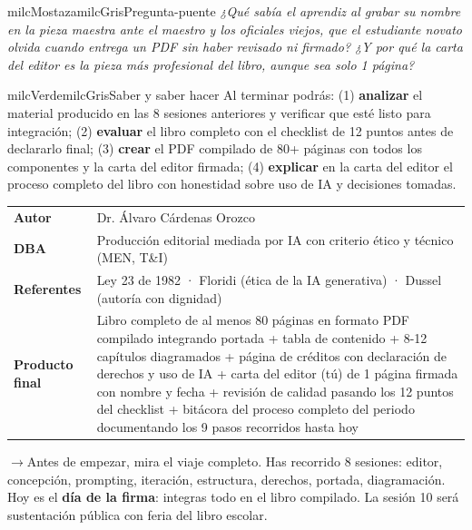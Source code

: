 \documentclass[11pt,letterpaper]{article}
\newcommand{\puente}[1]{%
  \begin{puentebox}%
    \textcolor{milcGradeDark}{$\rightarrow$}\hspace{2mm}#1%
  \end{puentebox}%
}
\begin{document}
\begin{softbox}{milcMostaza}{milcGris}{Pregunta-puente}
\textit{¿Qué sabía el aprendiz al grabar su nombre en la pieza maestra ante el maestro y los oficiales viejos, que el estudiante novato olvida cuando entrega un PDF sin haber revisado ni firmado? ¿Y por qué la carta del editor es la pieza más profesional del libro, aunque sea solo 1 página?}
\end{softbox}

\begin{softbox}{milcVerde}{milcGris}{Saber y saber hacer}
Al terminar podrás: (1) \textbf{analizar} el material producido en las 8 sesiones anteriores y verificar que esté listo para integración; (2) \textbf{evaluar} el libro completo con el checklist de 12 puntos antes de declararlo final; (3) \textbf{crear} el PDF compilado de 80+ páginas con todos los componentes y la carta del editor firmada; (4) \textbf{explicar} en la carta del editor el proceso completo del libro con honestidad sobre uso de IA y decisiones tomadas.
\end{softbox}



\small
\begin{tabularx}{\textwidth}{>{\bfseries}p{3.0cm}Y}
Autor & Dr. Álvaro Cárdenas Orozco\\
DBA & Producción editorial mediada por IA con criterio ético y técnico (MEN, T\&I)\\
Referentes & Ley 23 de 1982 · Floridi (ética de la IA generativa) · Dussel (autoría con dignidad)\\
Producto final & Libro completo de al menos 80 páginas en formato PDF compilado integrando portada + tabla de contenido + 8-12 capítulos diagramados + página de créditos con declaración de derechos y uso de IA + carta del editor (tú) de 1 página firmada con nombre y fecha + revisión de calidad pasando los 12 puntos del checklist + bitácora del proceso completo del periodo documentando los 9 pasos recorridos hasta hoy\\
\end{tabularx}
\normalsize

\puente{Antes de empezar, mira el viaje completo. Has recorrido 8 sesiones: editor, concepción, prompting, iteración, estructura, derechos, portada, diagramación. Hoy es el \textbf{día de la firma}: integras todo en el libro compilado. La sesión 10 será sustentación pública con feria del libro escolar.}
\end{document}
